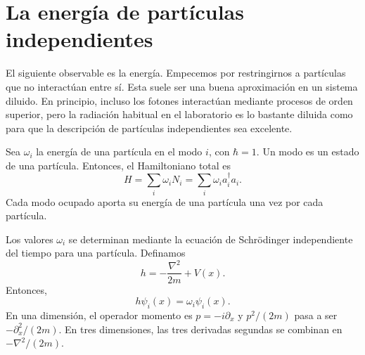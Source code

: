 \begin{classroomqa}
\end{classroomqa}

\section{La energía de partículas independientes}

El siguiente observable es la energía. Empecemos por restringirnos a partículas que no interactúan entre sí. Esta suele ser una buena aproximación en un sistema diluido. En principio, incluso los fotones interactúan mediante procesos de orden superior, pero la radiación habitual en el laboratorio es lo bastante diluida como para que la descripción de partículas independientes sea excelente.

Sea \(\omega_i\) la energía de una partícula en el modo \(i\), con \(\hbar=1\). Un modo es un estado de una partícula. Entonces, el Hamiltoniano total es
\begin{equation}
H=\sum_i\omega_i N_i
=\sum_i\omega_i a_i^\dagger a_i.
\label{eq:l07-mode-hamiltonian}
\end{equation}
Cada modo ocupado aporta su energía de una partícula una vez por cada partícula.

\begin{classroomqa}
\end{classroomqa}

Los valores \(\omega_i\) se determinan mediante la ecuación de Schrödinger independiente del tiempo para una partícula. Definamos
\begin{equation}
h=-\frac{\nabla^2}{2m}+V(x).
\label{eq:l07-one-particle-h}
\end{equation}
Entonces,
\begin{equation}
h\psi_i(x)=\omega_i\psi_i(x).
\label{eq:l07-schrodinger-eigenvalue}
\end{equation}
En una dimensión, el operador momento es \(p=-i\partial_x\) y \(p^2/(2m)\) pasa a ser \(-\partial_x^2/(2m)\). En tres dimensiones, las tres derivadas segundas se combinan en \(-\nabla^2/(2m)\).

